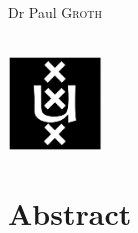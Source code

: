 \documentclass{article}
\newcommand{\red}[1]{{\color{red}{#1}}}
\begin{document}
\begin{titlepage}
\begin{minipage}[t]{0.4\textwidth}
\begin{flushright}
Dr Paul \textsc{Groth}\\

\end{flushright}

\end{minipage}\\[2cm]









\includegraphics[width=2.5cm]{data/images/uva.png}\\ %


 




\vfill %



\end{titlepage}

\tableofcontents
\listoftables
\newpage

\section*{Abstract}
\end{document}
